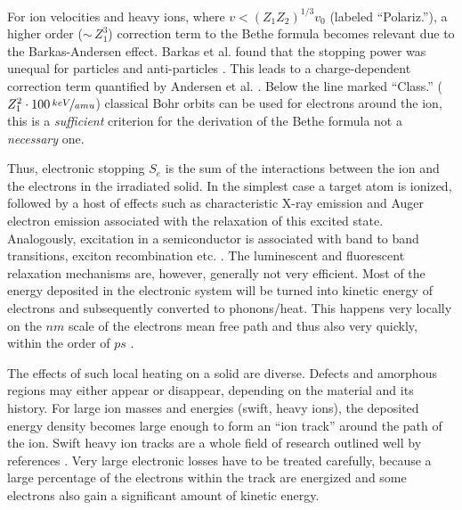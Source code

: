 For ion velocities and heavy ions, where $v < (Z_1Z_2)^{1/3}v_0$ (labeled ``Polariz.''), a higher order ($\sim\,Z_1^3$) correction term to the Bethe formula becomes relevant due to the Barkas-Andersen effect. Barkas et al. found that the stopping power was unequal for particles and anti-particles \cite{smith_measurements_1953}. This leads to a charge-dependent correction term quantified by Andersen et al. \cite{andersen_experimental_1969,sigmund_notes_2014}. Below the line marked ``Class.'' ($Z_1^2\cdot 100\,\nicefrac{keV}{amu}$) classical Bohr orbits can be used for electrons around the ion, this is a \emph{sufficient} criterion for the derivation of the Bethe formula not a \emph{necessary} one.

Thus, electronic stopping $S_e$ is the sum of the interactions between the ion and the electrons in the irradiated solid. In the simplest case a target atom is ionized, followed by a host of effects such as characteristic X-ray emission and Auger electron emission associated with the relaxation of this excited state. Analogously, excitation in a semiconductor is associated with band to band transitions, exciton recombination etc. \cite{wiedemann_uber_1888,boden_ionoluminescence_2012}. The luminescent and fluorescent relaxation mechanisms are, however, generally not very efficient. Most of the energy deposited in the electronic system will be turned into kinetic energy of electrons and subsequently converted to phonons/heat. This happens very locally on the $nm$ scale of the electrons mean free path and thus also very quickly, within the order of $ps$ \cite{toulemonde_transient_1992, nastasi/mayer/hirvonen_ion-solid_2008}. 


The effects of such local heating on a solid are diverse. Defects and amorphous regions may either appear or disappear, depending on the material and its history. For large ion masses and energies (swift, heavy ions), the deposited energy density becomes large enough to form an ``ion track'' around the path of the ion. Swift heavy ion tracks are a whole field of research outlined well by references \cite{toulemonde_transient_1992,miotello_revisiting_1997,wesch_effect_2004}. Very large electronic losses have to be treated carefully, because a large percentage of the electrons within the track are energized and some electrons also gain a significant amount of kinetic energy. 

